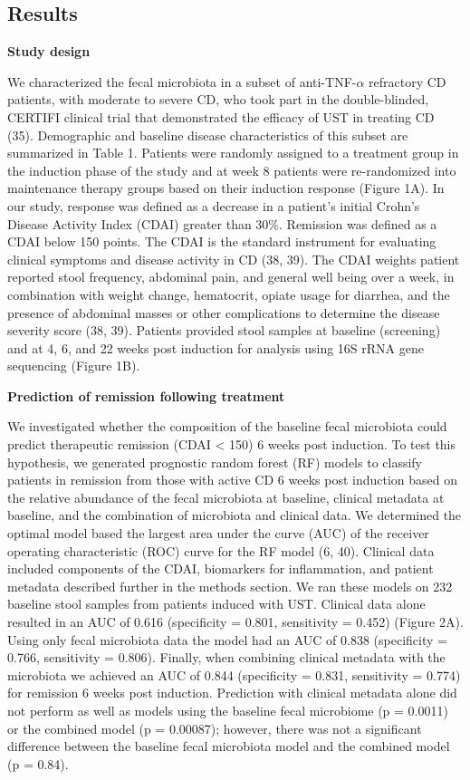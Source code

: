 \documentclass[12pt,]{article}
\begin{document}
\subsection{Results}\label{results}

\textbf{Study design}

We characterized the fecal microbiota in a subset of
anti-TNF-\({\alpha}\) refractory CD patients, with moderate to severe
CD, who took part in the double-blinded, CERTIFI clinical trial that
demonstrated the efficacy of UST in treating CD (35). Demographic and
baseline disease characteristics of this subset are summarized in Table
1. Patients were randomly assigned to a treatment group in the induction
phase of the study and at week 8 patients were re-randomized into
maintenance therapy groups based on their induction response (Figure
1A). In our study, response was defined as a decrease in a patient's
initial Crohn's Disease Activity Index (CDAI) greater than 30\%.
Remission was defined as a CDAI below 150 points. The CDAI is the
standard instrument for evaluating clinical symptoms and disease
activity in CD (38, 39). The CDAI weights patient reported stool
frequency, abdominal pain, and general well being over a week, in
combination with weight change, hematocrit, opiate usage for diarrhea,
and the presence of abdominal masses or other complications to determine
the disease severity score (38, 39). Patients provided stool samples at
baseline (screening) and at 4, 6, and 22 weeks post induction for
analysis using 16S rRNA gene sequencing (Figure 1B).

\textbf{Prediction of remission following treatment}

We investigated whether the composition of the baseline fecal microbiota
could predict therapeutic remission (CDAI \textless{} 150) 6 weeks post
induction. To test this hypothesis, we generated prognostic random
forest (RF) models to classify patients in remission from those with
active CD 6 weeks post induction based on the relative abundance of the
fecal microbiota at baseline, clinical metadata at baseline, and the
combination of microbiota and clinical data. We determined the optimal
model based the largest area under the curve (AUC) of the receiver
operating characteristic (ROC) curve for the RF model (6, 40). Clinical
data included components of the CDAI, biomarkers for inflammation, and
patient metadata described further in the methods section. We ran these
models on 232 baseline stool samples from patients induced with UST.
Clinical data alone resulted in an AUC of 0.616 (specificity = 0.801,
sensitivity = 0.452) (Figure 2A). Using only fecal microbiota data the
model had an AUC of 0.838 (specificity = 0.766, sensitivity = 0.806).
Finally, when combining clinical metadata with the microbiota we
achieved an AUC of 0.844 (specificity = 0.831, sensitivity = 0.774) for
remission 6 weeks post induction. Prediction with clinical metadata
alone did not perform as well as models using the baseline fecal
microbiome (p = 0.0011) or the combined model (p = 0.00087); however,
there was not a significant difference between the baseline fecal
microbiota model and the combined model (p = 0.84).
\end{document}
